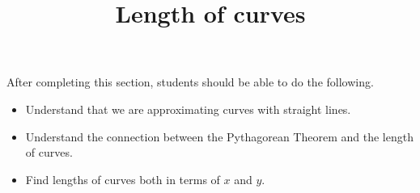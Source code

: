 \documentclass{ximera}
\title{Length of curves}
\begin{document}
\begin{abstract}
\end{abstract}

\maketitle

\begin{sectionOutcomes}

After completing this section, students should be able to do the following.

\begin{itemize}
\item Understand that we are approximating curves with straight lines.
\item Understand the connection between the Pythagorean Theorem and the length of curves.
\item Find lengths of curves both in terms of $x$ and $y$.
\end{itemize}

\end{sectionOutcomes}
\end{document}
